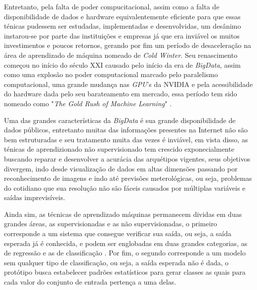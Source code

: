 \documentclass[12pt, %
openright, 
oneside, %
a4paper,    %
brazil]{facom-ufu-abntex2}
\begin{document}
Entretanto, pela falta de poder compucitacional, assim como a falta de disponibilidade de dados e hardware equivalentemente eficiente para que essas ténicas pudessem ser estudadas, implementadas e desenvolvidas, um desânimo instarou-se por parte das instituições e empresas já que era inviável os muitos investimentos e poucos retornos, gerando por fim um período de desaceleração na área de aprendizado de máquina nomeado de \textit{Cold Winter}. Seu renascimento começou no início do século XXI causado pelo início da era de \textit{BigData}, assim como uma explosão no poder computacional marcado pelo paralelismo computacional, uma grande mudança nas \textit{GPU}'s da NVIDIA e pela acessibilidade do hardware dada pelo seu barateamento em mercado, essa período tem sido nomeado como "\textit{The Gold Rush of Machine Learning}" \cite{fradkov2020early}.

Uma das grandes características da \textit{BigData} é sua grande disponibilidade de dados públicos, entretanto muitas das informações presentes na Internet não são bem estruturadas e seu tratamento muita das vezes é inviável, em vista disso, as ténicas de aprendizionado não supervisionado tem crescido exponecialmente buscando reparar e desenvolver a acurácia das arquétipos vigentes, seus objetivos divergem, indo desde visualização de dados em altas dimensões passando por reconhecimento de imagens e indo até previsões meterológicas, ou seja, problemas do cotidiano que sua resolução não são fáceis causados por múltiplas variáveis e saídas imprevisíveis.

Ainda sim, as técnicas de aprendizado máquinas permanecem dividas em duas grandes áreas, as supervisionadas e as não supervisionadas, o primeiro corresponde a um sistema que consegue verificar sua saída, ou seja, a saída esperada já é conhecida, e podem ser englobadas em duas grandes categorias, as de regressão e as de classificação \cite{soofi2017classification}. Por fim, o segundo corresponde a um modelo sem qualquer tipo de classificação, ou seja, a saída esperada não é dada, o protótipo busca estabelecer padrões estatísticos para gerar classes as quais para cada valor do conjunto de entrada pertença a uma delas.
\end{document}
